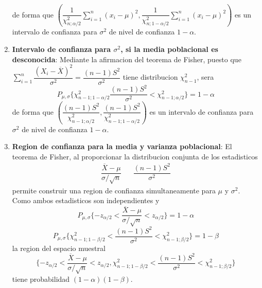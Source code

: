 \documentclass[10pt]{extarticle}
\newcommand{\<}{\langle}
\renewcommand{\>}{\rangle}
\theoremstyle{definition}
\begin{document}
\begin{enumerate}
\begin{equation*}
        \end{equation*}
        de forma que $(\dfrac{1}{\chi^2_{n;\alpha/2}}\sum_{i=1}^n(x_i-\mu)^2, \dfrac{1}{\chi^2_{n;1-\alpha/2}}\sum_{i=1}^n(x_i-\mu)^2)$ es un intervalo de confianza para $\sigma^2$ de nivel de confianza $1-\alpha$.
  \item \textbf{Intervalo de confianza para $\sigma^2$, si la media poblacional es desconocida}: Mediante la afirmacion del teorema de Fisher, puesto que $\sum_{i=1}^n \dfrac{(X_i - \overline{X})^2}{\sigma^2}=\dfrac{(n-1)S^2}{\sigma^2}$ tiene distribucion $\chi^2_{n-1}$, sera
        \begin{equation*}
          P_{\mu, \sigma} \{ \chi^2_{n-1;1-\alpha/2} \dfrac{(n-1)S^2}{\sigma^2} < \chi^2_{n-1;\alpha/2} \} = 1 - \alpha
        \end{equation*}
        de forma que $(\dfrac{(n-1)S^2}{\chi^2_{n-1;\alpha/2}}, \dfrac{(n-1)S^2}{\chi^2_{n-1;1-\alpha/2}})$ es un intervalo de confianza para $\sigma^2$  de nivel de confianza $1-\alpha$.

  \item \textbf{Region de confianza para la media y varianza poblacional}: El teorema de Fisher, al proporcionar la distribucion conjunta de los estadisticos
        \begin{align*}
          \dfrac{\overline{X} - \mu}{\sigma/\sqrt{n}} &  & \dfrac{(n-1)S^2}{\sigma^2}
        \end{align*}
        permite construir una region de confianza simultaneamente para $\mu$ y $\sigma^2$. Como ambos estadisticos son independientes y
        \begin{equation*}
          P_{\mu, \sigma}\{ -z_{\alpha/2} < \dfrac{\overline{X} - \mu}{\sigma/\sqrt{n}} < z_{\alpha/2}\} = 1-\alpha
        \end{equation*}
        \begin{equation*}
          P_{\mu, \sigma} \{ \chi^2_{n-1;1-\beta/2} < \dfrac{(n-1)S^2}{\sigma^2} < \chi^2_{n-1;\beta/2}  \} = 1 - \beta
        \end{equation*}
        la region del espacio muestral
        \begin{equation*}
          \{ -z_{\alpha/2} < \dfrac{\overline{X} - \mu}{\sigma/\sqrt{n}} < z_{\alpha/2}, \chi^2_{n-1;1-\beta/2} < \dfrac{(n-1)S^2}{\sigma^2} < \chi^2_{n-1;\beta/2} \}
        \end{equation*}
        tiene probabilidad $(1-\alpha)(1-\beta)$.


\end{enumerate}
\end{document}
